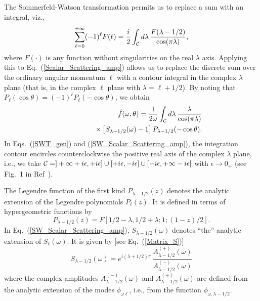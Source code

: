 \documentclass[aps,prd,longbibliography,reprint,twocolumn,amsmath,amssymb,amsfonts,showpacs,footnote,superscriptaddress]{revtex4-1}%
\begin{document}
The Sommerfeld-Watson transformation \cite{Watson18,Sommerfeld49,Newton:1982qc} permits us to replace a sum with an integral, viz.,
\begin{equation}\label{SWT_gen}
\sum_{\ell=0}^{+\infty} (-1)^\ell F(\ell)= \frac{i}{2} \int_{\cal C} d\lambda \, \frac{F(\lambda -1/2)}{\cos (\pi \lambda)} ,
\end{equation}
where $F(\cdot)$ is any function without singularities on the real $\lambda$ axis. Applying this to Eq.~(\ref{Scalar_Scattering_amp}) allows us to replace the discrete sum over the ordinary angular momentum $\ell$ with a contour integral in the complex $\lambda$ plane (that is, in the complex $\ell$ plane with $\lambda = \ell +1/2$). By noting that $P_\ell (\cos \theta)=(-1)^\ell P_\ell (-\cos \theta)$, we obtain
\begin{eqnarray}\label{SW_Scalar_Scattering_amp}
& & \hat{f}(\omega,\theta) = \frac{1}{2 \omega}  \int_{\cal C} d\lambda \, \frac{\lambda}{\cos (\pi \lambda)} \nonumber \\
&&  \qquad\qquad   \times \left[ S_{\lambda -1/2} (\omega) -1 \right]P_{\lambda -1/2} (-\cos \theta).
\end{eqnarray}
In Eqs.~(\ref{SWT_gen}) and (\ref{SW_Scalar_Scattering_amp}), the integration contour encircles counterclockwise the positive real axis of the complex $\lambda$ plane, i.e., we take ${\cal C}=]+\infty +i\epsilon,+i\epsilon] \cup
[+i\epsilon,-i\epsilon] \cup [-i\epsilon, +\infty -i\epsilon[$ with $\epsilon \to 0_+$ (see Fig.~1 in Ref~\cite{Folacci:2019cmc}).

The Legendre function of the first kind $P_{\lambda -1/2} (z)$ denotes the analytic extension of the Legendre polynomials $P_\ell (z)$. It is defined in terms of hypergeometric functions by \cite{AS65}
\begin{equation}\label{Def_ext_LegendreP}
P_{\lambda -1/2} (z) = F[1/2-\lambda,1/2+\lambda;1;(1-z)/2].
\end{equation}
In Eq.~(\ref{SW_Scalar_Scattering_amp}), $S_{\lambda -1/2} (\omega)$ denotes ``the'' analytic extension of $S_\ell (\omega)$. It is given by [see Eq.~(\ref{Matrix_S})]
\begin{equation}\label{Matrix_S_CAM}
  S_{\lambda -1/2}(\omega) =  e^{i(\lambda + 1/2)\pi} \, \frac{A_{\lambda -1/2}^{(+)}(\omega)}{A_{\lambda -1/2}^{(-)}(\omega)}
\end{equation}
where the complex amplitudes $A^{(-)}_{\lambda -1/2} (\omega)$ and  $A^{(+)}_{\lambda -1/2} (\omega)$ are defined from the analytic extension of the modes $\phi_{\omega \ell}$, i.e., from the function $\phi_{\omega ,\lambda -1/2}$.
\end{document}
